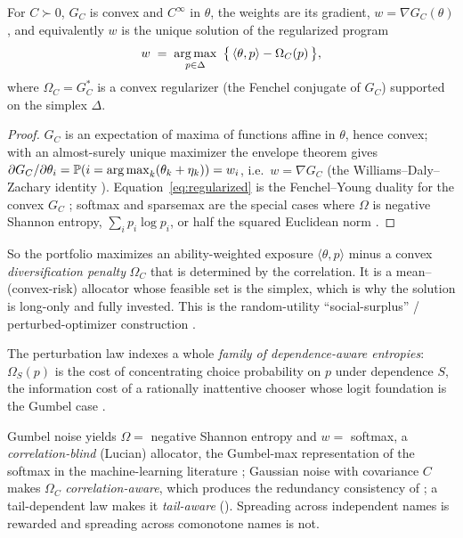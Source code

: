 \begin{theorem}
\label{thm:objective}
For $C \succ 0$, $G_C$ is convex and $C^\infty$ in $\theta$, the weights are its gradient,
$w = \nabla G_C(\theta)$, and equivalently $w$ is the unique solution of the
regularized program
\begin{equation}
  w \;=\; \operatorname*{arg\,max}_{p \in \Delta}\ \big\{\, \langle \theta, p \rangle
  - \Omega_C(p) \,\big\},
  \label{eq:regularized}
\end{equation}
where $\Omega_C = G_C^{*}$ is a convex regularizer (the Fenchel conjugate of
$G_C$) supported on the simplex $\Delta$.
\end{theorem}
\begin{proof}
$G_C$ is an expectation of maxima of functions affine in $\theta$, hence convex; with an
almost-surely unique maximizer the envelope theorem gives
$\partial G_C/\partial\theta_i = \mathbb{P}(i = \operatorname*{arg\,max}_k(\theta_k + \eta_k)) = w_i$,
i.e.\ $w = \nabla G_C$ (the Williams--Daly--Zachary identity
\parencite{williams1977, mcfadden1981}). Equation~\eqref{eq:regularized} is the
Fenchel--Young duality for the convex $G_C$ \parencite{blondel2020}; softmax and
sparsemax are the special cases where $\Omega$ is negative Shannon entropy,
$\sum_i p_i\log p_i$, or half the squared Euclidean norm \parencite{martins2016}.
\end{proof}

So the portfolio maximizes an ability-weighted exposure $\langle\theta,p\rangle$
minus a convex \emph{diversification penalty} $\Omega_C$ that is determined by the
correlation. It is a mean--(convex-risk) allocator whose feasible set is the
simplex, which is why the solution is long-only and fully invested. This is the
random-utility ``social-surplus'' / perturbed-optimizer construction
\parencite{mcfadden1981, williams1977, berthet2020, papandreou2011}.

The perturbation law indexes a whole \emph{family of dependence-aware entropies}:
$\Omega_S(p)$ is the cost of concentrating choice probability on $p$ under
dependence $S$, the information cost of a rationally inattentive chooser whose logit
foundation is the Gumbel case \parencite{matejka2015, fosgerau2020}.

Gumbel noise yields $\Omega = $ negative Shannon entropy and $w = $ softmax, a
\emph{correlation-blind} (Lucian) allocator, the Gumbel-max representation of the softmax in
the machine-learning literature \parencite{jang2017, maddison2017}; Gaussian noise with
covariance $C$ makes $\Omega_C$ \emph{correlation-aware}, which produces the
redundancy consistency of ; a tail-dependent law makes it
\emph{tail-aware} (). Spreading across independent names is rewarded
and spreading across comonotone names is not.

